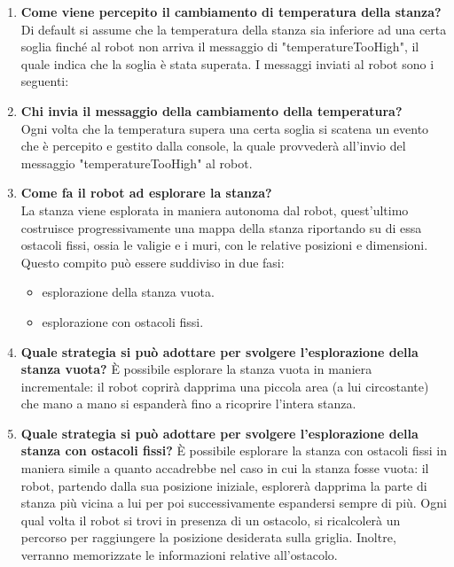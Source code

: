 \begin{enumerate}
    
        
    \item \textbf{Come viene percepito il cambiamento di temperatura della stanza?}\\
    Di default si assume che la temperatura della stanza sia inferiore ad una certa soglia finché al robot non arriva il messaggio di "temperatureTooHigh", il quale indica che la soglia è stata superata. I messaggi inviati al robot sono i seguenti:
   
    
        
    \item \textbf{Chi invia il messaggio della cambiamento della temperatura?}\\
    Ogni volta che la temperatura supera una certa soglia si scatena un evento che è percepito e gestito dalla console, la quale provvederà all'invio del messaggio "temperatureTooHigh" al robot.
        
    \item \textbf{Come fa il robot ad esplorare la stanza?}\\
     La stanza viene esplorata in maniera autonoma dal robot, quest'ultimo costruisce progressivamente una mappa della stanza riportando su di essa ostacoli fissi, ossia le valigie e i muri, con le relative posizioni e dimensioni. Questo compito può essere suddiviso in due fasi:  
    \begin{itemize}
        \item esplorazione della stanza vuota.
        \item esplorazione con ostacoli fissi.
    \end{itemize}{}
    
    \item \textbf{Quale strategia si può adottare per svolgere l'esplorazione della stanza vuota?}
    È possibile esplorare la stanza vuota in maniera incrementale: il robot coprirà dapprima una piccola area (a lui circostante) che mano a mano si espanderà fino a ricoprire l'intera stanza.
    
    \item \textbf{Quale strategia si può adottare per svolgere l'esplorazione della stanza con ostacoli fissi?}
    È possibile esplorare la stanza con ostacoli fissi in maniera simile a quanto accadrebbe nel caso in cui la stanza fosse vuota: il robot, partendo dalla sua posizione iniziale, esplorerà dapprima la parte di stanza più vicina a lui per poi successivamente espandersi sempre di più. Ogni qual volta il robot si trovi in presenza di un ostacolo, si ricalcolerà un percorso per raggiungere la posizione desiderata sulla griglia. Inoltre, verranno memorizzate le informazioni relative all'ostacolo.
    

\end{enumerate}
